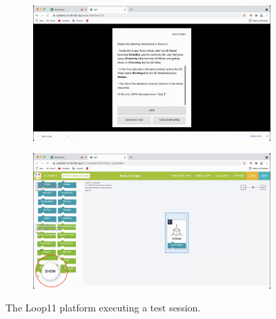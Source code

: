 \begin{figure}[H]
    \begin{subfigure}{\textwidth}
    \centering
    \includegraphics[width=\linewidth]{Figures/Evaluation/eval-platform1.png}
    \caption{}
    \label{fig:loop-11-popup}
    \end{subfigure}
    \begin{subfigure}{\textwidth}
    \centering
    \includegraphics[width=\linewidth]{Figures/Evaluation/eval-platform2.png}
    \caption{}
    \label{fig:loop-11-button}
    \end{subfigure}
\caption{The Loop11 platform executing a test session.}
\label{fig:loop-11}
\end{figure}